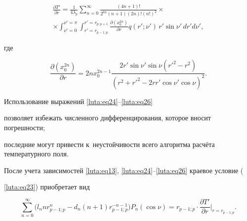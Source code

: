 {{{{{{{{{{{\begin{equation}
\end{equation}

\begin{multline}

\label{luta:eq25}

\frac{\partial T'}{\partial r}=

\frac1{4\lambda _p}

\sum\limits_{n=0}^\infty

\frac{(4n+1)!}{2^{6n}(n+1)(2n)!(n!)^2} \times \\ \times

\int_{\nu '=0}^{\nu '=\pi }

\int_{r'=r_{p-1; p}}^{r'=r_{p; p+1}}

\frac{\partial (x_0 ^{2n})}{\partial r} q(r'; \nu ')\, r' \sin \nu ' \, dr' d\nu ',

\end{multline}

где

\begin{equation}

\label{luta:eq26}

\frac{\partial (x_0 ^{2n})}{\partial r}=

2nx_0 ^{2n-1}

\frac{2r'\sin \nu '\sin \nu (r'^2-r^2)}{(r^2+r'^2-2rr'\cos \nu '\cos \nu )^2}.

\end{equation}

Использование выражений \eqref{luta:eq24}--\eqref{luta:eq26}

позволяет избежать численного дифференцирования, которое вносит погрешности;

последние могут привести к~не\-ус\-той\-чи\-вос\-ти всего алгоритма расчёта температурного поля.



После учета зависимостей \eqref{luta:eq13}, \eqref{luta:eq24}--\eqref{luta:eq26} краевое условие ({\ref{luta:eq23}) приобретает вид

\begin{equation}

\label{luta:eq27}

\sum\limits_{n=0}^\infty

\bigl( l_n nr_{p-1; p}^n -d_n (n+1)r_{p-1; p}^{-n-1}  \bigr)P_n (\cos \nu ) =r_{p-1; p}\cdot

\frac{\partial T'}{\partial r}\Big|_{r=r_{p-1; p}  }.

\end{equation}

}}}}}}}}}}}}
